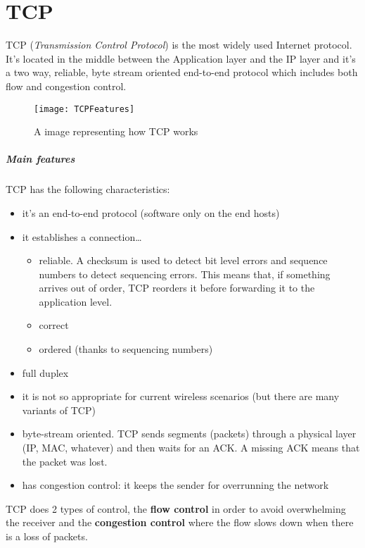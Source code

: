 \chapter{TCP}

TCP (\textit{Transmission Control Protocol}) is the most widely used Internet
protocol. It's located in the middle between the Application layer and the IP
layer and it's a two way, reliable, byte stream oriented end-to-end protocol
which includes both flow and congestion control.

\begin{figure}[t]
  \centering
  \texttt{[image: TCPFeatures]}
  \label{fig:tcp:features}
  \caption[TCP Features]{A image representing how TCP works}
\end{figure}

\paragraph*{Main features}

TCP has the following characteristics:
\begin{itemize}
\item it's an end-to-end protocol (software only on the end hosts)
\item it establishes a connection\dots
  \begin{itemize}
  \item reliable. A checksum is used to detect bit level errors and sequence
    numbers to detect sequencing errors. This means that, if something arrives
    out of order, TCP reorders it before forwarding it to the application level.
  \item correct
  \item ordered (thanks to sequencing numbers)
  \end{itemize}
\item full duplex
\item it is not so appropriate for current wireless scenarios (but there are
  many variants of TCP)
\item byte-stream oriented. TCP sends segments (packets) through a 
  physical layer (IP, MAC, whatever) and then waits for an ACK. A missing ACK 
  means that the packet was lost.
\item has congestion control: it keeps the sender for overrunning the network
\end{itemize}

TCP does 2 types of control, the \textbf{flow control} in order to avoid
overwhelming the receiver and the \textbf{congestion control} where the flow
slows down when there is a loss of packets.

